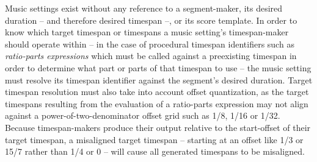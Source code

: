 Music settings exist without any reference to a segment-maker, its desired
duration -- and therefore desired timespan --, or its score template. In order
to know which target timespan or timespans a music setting's timespan-maker
should operate within -- in the case of procedural timespan identifiers such as
\emph{ratio-parts expressions} which must be called against a preexisting
timespan in order to determine what part or parts of that timespan to use --
the music setting must resolve its timespan identifier against the segment's
desired duration. Target timespan resolution must also take into account offset
quantization, as the target timespans resulting from the evaluation of a
ratio-parts expression may not align against a power-of-two-denominator offset
grid such as 1/8, 1/16 or 1/32. Because timespan-makers produce their output
relative to the start-offset of their target timespan, a misaligned target
timespan -- starting at an offset like 1/3 or 15/7 rather than 1/4 or 0 -- will
cause all generated timespans to be misaligned.

